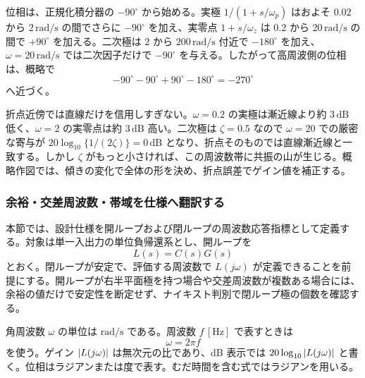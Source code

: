 \begin{example}[積の形によるボード線図の漸近作図]
位相は、正規化積分器の $-90^\circ$ から始める。実極 $1/(1+s/\omega_p)$ はおよそ $0.02$ から $2\,\mathrm{rad/s}$ の間でさらに $-90^\circ$ を加え、実零点 $1+s/\omega_z$ は $0.2$ から $20\,\mathrm{rad/s}$ の間で $+90^\circ$ を加える。二次極は $2$ から $200\,\mathrm{rad/s}$ 付近で $-180^\circ$ を加え、$\omega=20\,\mathrm{rad/s}$ では二次因子だけで $-90^\circ$ を与える。したがって高周波側の位相は、概略で
\begin{equation}
  -90^\circ-90^\circ+90^\circ-180^\circ=-270^\circ
\end{equation}
へ近づく。

折点近傍では直線だけを信用しすぎない。$\omega=0.2$ の実極は漸近線より約 $3\,\mathrm{dB}$ 低く、$\omega=2$ の実零点は約 $3\,\mathrm{dB}$ 高い。二次極は $\zeta=0.5$ なので $\omega=20$ での厳密な寄与が $20\log_{10}\{1/(2\zeta)\}=0\,\mathrm{dB}$ となり、折点そのものでは直線漸近線と一致する。しかし $\zeta$ がもっと小さければ、この周波数帯に共振の山が生じる。概略作図では、傾きの変化で全体の形を決め、折点誤差でゲイン値を補正する。
\end{example}

\subsubsection{余裕・交差周波数・帯域を仕様へ翻訳する}

本節では、設計仕様を開ループおよび閉ループの周波数応答指標として定義する。対象は単一入出力の単位負帰還系とし、開ループを
\begin{equation}
  L(s)=C(s)G(s)
\end{equation}
とおく。閉ループが安定で、評価する周波数で $L(j\omega)$ が定義できることを前提にする。開ループが右半平面極を持つ場合や交差周波数が複数ある場合には、余裕の値だけで安定性を断定せず、ナイキスト判別で閉ループ極の個数を確認する。

角周波数 $\omega$ の単位は $\mathrm{rad/s}$ である。周波数 $f\,[\mathrm{Hz}]$ で表すときは
\begin{equation}
  \omega=2\pi f
\end{equation}
を使う。ゲイン $\left|L(j\omega)\right|$ は無次元の比であり、dB 表示では $20\log_{10}\left|L(j\omega)\right|$ と書く。位相はラジアンまたは度で表す。むだ時間を含む式ではラジアンを用いる。

